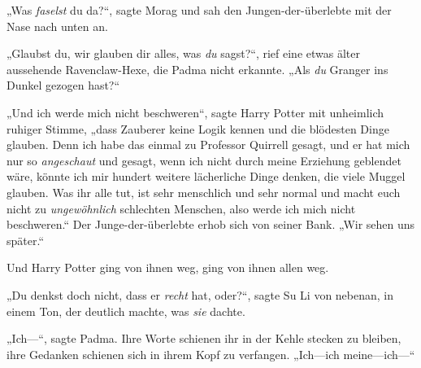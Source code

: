 „Was \emph{faselst} du da?“, sagte Morag und sah den Jungen-der-überlebte mit der Nase nach unten an.

„Glaubst du, wir glauben dir alles, was \emph{du} sagst?“, rief eine etwas älter aussehende Ravenclaw-Hexe, die Padma nicht erkannte.
„Als \emph{du} Granger ins Dunkel gezogen hast?“

„Und ich werde mich nicht beschweren“, sagte Harry Potter mit unheimlich ruhiger Stimme, „dass Zauberer keine Logik kennen und die blödesten Dinge glauben. Denn ich habe das einmal zu Professor Quirrell gesagt, und er hat mich nur so \emph{angeschaut} und gesagt, wenn ich nicht durch meine Erziehung geblendet wäre, könnte ich mir hundert weitere lächerliche Dinge denken, die viele Muggel glauben. Was ihr alle tut, ist sehr menschlich und sehr normal und macht euch nicht zu \emph{ungewöhnlich} schlechten Menschen, also werde ich mich nicht beschweren.“
Der Junge-der-überlebte erhob sich von seiner Bank.
„Wir sehen uns später.“

Und Harry Potter ging von ihnen weg, ging von ihnen allen weg.

„Du denkst doch nicht, dass er \emph{recht} hat, oder?“, sagte Su Li von nebenan, in einem Ton, der deutlich machte, was \emph{sie} dachte.

„Ich—“, sagte Padma. Ihre Worte schienen ihr in der Kehle stecken zu bleiben, ihre Gedanken schienen sich in ihrem Kopf zu verfangen.
„Ich—ich meine—ich—“

